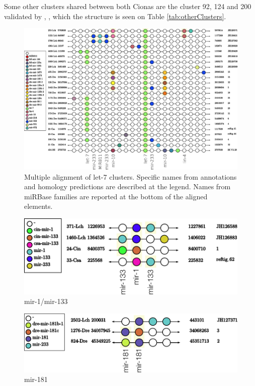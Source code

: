 \documentclass[graybox]{svmult}
\begin{document}
Some other clusters shared between both Cionas are the cluster 92, 124 and 200  
validated by \cite{Norden-Krichmar2007}, \cite{Fu:08}, \cite{Hendrix2010} 
which the structure is seen on Table \ref{tab:otherClusters}.    


\begin{figure}[ht!]
\sidecaption[t]
\includegraphics[width=\textwidth]{./Images/Cluster_images/let-7_101_128}
\caption{Multiple alignment of let-7 clusters. Specific names from annotations 
and homology predictions are described at the legend. Names from miRBase 
families are reported at the bottom of the aligned elements.} 
\label{fig:let-7}
\end{figure}

\begin{figure}[ht!]
\sidecaption[t]
\includegraphics[width=\textwidth]{./Images/Cluster_images/mir-133_113_33}
\caption{mir-1/mir-133}
\label{fig:mir-1}
\end{figure}

\begin{figure}[ht!]
\sidecaption[t]
\includegraphics[width=\textwidth]{./Images/Cluster_images/mir-181_105_2502}
\caption{mir-181}
\label{fig:mir-1}
\end{figure}
\end{document}
